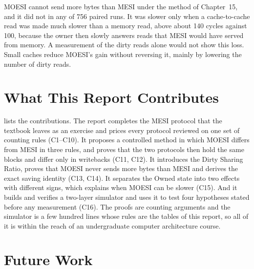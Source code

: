 MOESI cannot send more bytes than MESI under the method of Chapter~15, and it did
not in any of 756 paired runs. It was slower only when a cache-to-cache read was
made much slower than a memory read, above about 140 cycles against 100, because
the owner then slowly answers reads that MESI would have served from memory. A
measurement of the dirty reads alone would not show this loss. Small caches reduce
MOESI's gain without reversing it, mainly by lowering the number of dirty reads.

\section{What This Report Contributes}
\label{sec:conc-contrib}
%

 lists the contributions. The report completes the MESI
protocol that the textbook leaves as an exercise and prices every protocol reviewed
on one set of counting rules (C1--C10). It proposes a controlled method in which
MOESI differs from MESI in three rules, and proves that the two protocols then hold
the same blocks and differ only in writebacks (C11, C12). It introduces the Dirty
Sharing Ratio, proves that MOESI never sends more bytes than MESI and derives the
exact saving identity (C13, C14). It separates the Owned state into two effects with
different signs, which explains when MOESI can be slower (C15). And it builds and
verifies a two-layer simulator and uses it to test four hypotheses stated before
any measurement (C16). The proofs are counting arguments and the simulator is a few
hundred lines whose rules are the tables of this report, so all of it is within the
reach of an undergraduate computer architecture course.

\section{Future Work}
\label{sec:conc-future}
\label{sec:conc-close}
%

